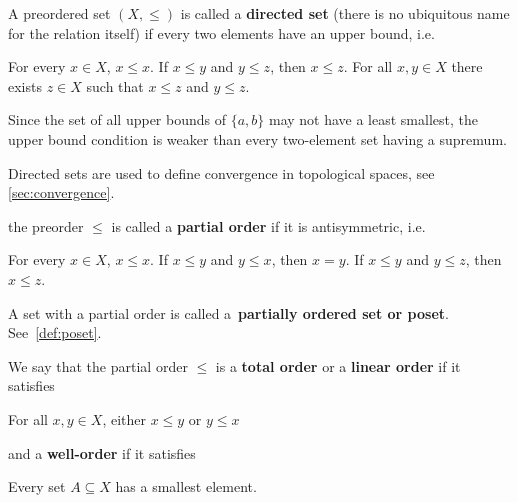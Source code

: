 \begin{definition}
\begin{defenum}
    \item\label{def:order/directed}\cite[8]{Engelking1989} A preordered set \( (X, \leq) \) is called a \textbf{directed set} (there is no ubiquitous name for the relation itself) if every two elements have an upper bound, i.e.
    \begin{description}
       For every \( x \in X \), \( x \leq x \).
       If \( x \leq y \) and \( y \leq z \), then \( x \leq z \).
       For all \( x, y \in X \) there exists \( z \in X \) such that \( x \leq z \) and \( y \leq z \).
    \end{description}

    Since the set of all upper bounds of \( \{ a, b \} \) may not have a least smallest, the upper bound condition is weaker than every two-element set having a supremum.

    Directed sets are used to define convergence in topological spaces, see \cref{sec:convergence}.

    \item\label{def:order/partial}\cite[7]{Engelking1989} the preorder \( \leq \) is called a \textbf{partial order} if it is antisymmetric, i.e.
    \begin{description}
       For every \( x \in X \), \( x \leq x \).
       If \( x \leq y \) and \( y \leq x \), then \( x = y \).
       If \( x \leq y \) and \( y \leq z \), then \( x \leq z \).
    \end{description}

    A set with a partial order is called a~\textbf{partially ordered set or poset}. See~\cref{def:poset}.

    We say that the partial order \( \leq \) is a \textbf{total order} or a \textbf{linear order} if it satisfies
    \begin{description}
       For all \( x, y \in X \), either \( x \leq y \) or \( y \leq x \)
    \end{description}
    and a \textbf{well-order} if it satisfies
    \begin{description}
       Every set \( A \subseteq X \) has a smallest element.
    \end{description}


\end{defenum}
\end{definition}
